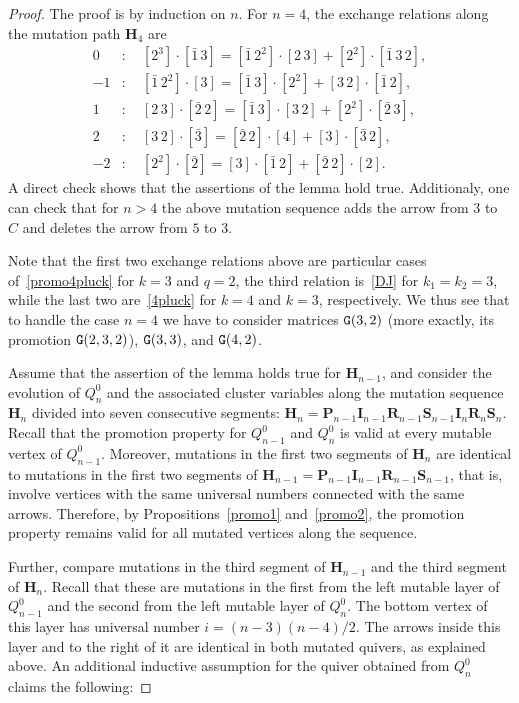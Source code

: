 \documentclass[10pt,a4paper]{amsart}
\def\Hs{\mathbf H}
\def\Is{\mathbf I}
\def\NG{{\tt G}}
\def\Ps{\mathbf P}
\def\Rs{\mathbf R}
\def\S{{\mathbf S}}
\begin{document}
\begin{proof} The proof is by induction on $n$. For $n=4$, the exchange relations along the mutation path $\Hs_4$ are
\begin{equation}\label{exchange4}
\begin{aligned}
0&:\quad [2^3]\cdot[\bar 1\,3]=[\bar 1\,2^2]\cdot[2\,3]+[2^2]\cdot[\bar 1\,3\,2], \\
-1&: \quad [\bar 1\,2^2]\cdot[3]=[\bar 1\,3]\cdot[2^2]+[3\,2]\cdot[\bar 1\,2],\\
1&: \quad [2\,3]\cdot[\bar 2\,2]=[\bar 1\,3]\cdot[3\,2]+[2^2]\cdot[\bar 2\,3], \\
2&: \quad [3\,2]\cdot[\bar 3]=[\bar 2\,2]\cdot[4]+[3]\cdot[\bar 3\,2],\\
-2&: \quad [2^2]\cdot[\bar 2]=[3]\cdot[\bar 1\,2]+[\bar 2\,2]\cdot[2].
\end{aligned}
\end{equation}
A direct check shows that the assertions of the lemma hold true. Additionaly, one can check that for $n>4$ the above mutation sequence adds the arrow from $3$ to $C$ and deletes the arrow from $5$ to $3$.

Note that the first two exchange relations above are 
particular cases of~\eqref{promo4pluck} for $k=3$ and $q=2$,   
the third relation is~\eqref{DJ} for $k_1=k_2=3$, while the last two are~\eqref{4pluck} for $k=4$ and $k=3$, respectively. We thus see that to handle the case $n=4$ we have to consider matrices $\NG(3,2)$ (more exactly, its promotion $\NG(2,3,2)$), $\NG(3,3)$, and $\NG(4,2)$.

Assume that the assertion of the lemma holds true for $\Hs_{n-1}$, and consider the evolution of $Q_n^0$ and the associated cluster variables along the mutation sequence $\Hs_n$ divided into seven consecutive segments: $\Hs_n=\Ps_{n-1}\Is_{n-1}\Rs_{n-1}\S_{n-1}\Is_n\Rs_n\S_n$. Recall that the promotion property for $Q_{n-1}^0$ and $Q_n^0$ is valid at every mutable vertex of $Q_{n-1}^0$. Moreover, mutations in the first two segments of $\Hs_n$ are identical to mutations in the first two segments of $\Hs_{n-1}=\Ps_{n-1}\Is_{n-1}\Rs_{n-1}\S_{n-1}$, that is, involve vertices with the same universal numbers connected with the same arrows. Therefore, by Propositions~\ref{promo1} and~\ref{promo2},
the promotion property remains valid for all mutated vertices along the sequence.

Further, compare mutations in the third segment of $\Hs_{n-1}$ and the third segment of $\Hs_{n}$. Recall that these
are mutations in the first from the left mutable layer of $Q_{n-1}^0$ and the second from the left mutable layer of $Q_n^0$. The bottom vertex of this layer has universal number $i=(n-3)(n-4)/2$.
The arrows inside this layer and to the right of it are identical in both mutated quivers, as explained above. 
An additional inductive assumption for the quiver obtained from $Q_n^0$ claims the following: 


\end{proof}
\end{document}
